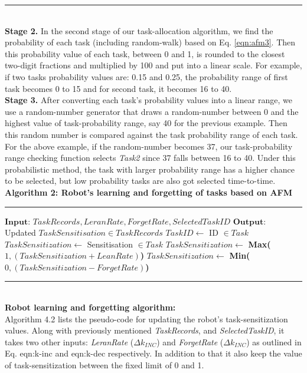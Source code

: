 \documentclass[final,5p,times,twocolumn]{elsarticle}
\newcommand{\HRule}{\rule{\linewidth}{0.3mm}}
\begin{document}
\vspace{-3mm} 
\HRule\\
\textbf{Stage 2.} In the second stage of our task-allocation algorithm, we  find the probability of each task (including random-walk) based on Eq. \ref{eqn:afm3}. Then this probability value of each task, between 0 and 1, is rounded to the closest two-digit fractions and multiplied by 100 and put into a linear scale. For example, if two tasks probability values are: 0.15 and  0.25, the probability range of first  task becomes 0 to 15 and for second task, it becomes 16 to 40.\\
\textbf{Stage 3.} After converting each task's probability values into a linear range, we use a random-number generator that draws a random-number between 0 and the highest value of task-probability range, say 40 for the previous example. Then this random number is compared against the task probability range of each task. For the above example, if the random-number becomes 37, our task-probability range checking function selects \textit{Task2} since 37 falls between 16 to 40. Under this probabilistic method, the task with larger probability range has a  higher chance to be selected, but low probability tasks are also got selected time-to-time.\\

\textbf{Algorithm 2: Robot's learning and forgetting of tasks based on AFM}
\vspace{-3mm}
\newline
\HRule
\begin{algorithmic}[1]
\begin{small}
\label{alg:update-sz}
\State $\textbf{Input: }  TaskRecords, LeranRate, ForgetRate, SelectedTaskID$
\State $\textbf{Output: }$ Updated $TaskSensitisation \in TaskRecords$
\State $ TaskID \gets  $ ID $\in Task$
\State $ TaskSensitization \gets  $   Sensitisation $ \in Task$
\State $ TaskSensitization \gets $ \textbf{Max(}$1, (TaskSensitization + LeanRate)$\textbf{)}
\Else
\State $ TaskSensitization \gets $ \textbf{Min(}$0, (TaskSensitization - ForgetRate)$\textbf{)}
\EndIf
\EndFor
\end{small}
\end{algorithmic}
\vspace{-3mm} 
\HRule\\
\textbf{Robot learning and forgetting algorithm:}\\
Algorithm 4.2 lists the pseudo-code for updating the robot's task-sensitization values. Along with previously mentioned \textit{TaskRecords}, and  \textit{SelectedTaskID}, it takes two other inputs: \textit{LeranRate} ($\Delta k_{INC} $) and \textit{ForgetRate} ($\Delta k_{INC} $) as outlined in Eq. {eqn:k-inc} and {eqn:k-dec} respectively.  In addition to that it also keep the value of task-sensitization between the fixed limit of 0 and 1.
\end{document}
